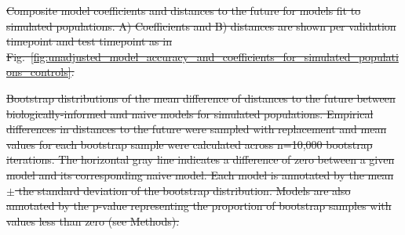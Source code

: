 \documentclass[9pt,lineno]{elife} %
\providecommand{\DIFdel}[1]{{\protect\color{red}\sout{#1}}}                      %
\providecommand{\DIFdelFL}[1]{\DIFdel{#1}} %
\providecommand{\DIFdeltex}[1]{{\protect\color{red}\sout{#1}}}                      %
\providecommand{\DIFdelFL}[1]{\DIFdel{#1}} %
\providecommand{\DIFdel}[1]{\texorpdfstring{\DIFdeltex{#1}}{}} %
\begin{document}
{%
\DIFdelFL{Composite model coefficients and distances to the future for models fit to simulated populations.
  A) Coefficients and B) distances are shown per validation timepoint and test timepoint as in Fig.~\ref{fig:unadjusted_model_accuracy_and_coefficients_for_simulated_populations_controls}.
  }}

{%
\DIFdelFL{Bootstrap distributions of the mean difference of distances to the future between biologically-informed and naive models for simulated populations.
  Empirical differences in distances to the future were sampled with replacement and mean values for each bootstrap sample were calculated across n=10,000 bootstrap iterations.
  The horizontal gray line indicates a difference of zero between a given model and its corresponding naive model.
  Each model is annotated by the mean $\pm$ the standard deviation of the bootstrap distribution.
  Models are also annotated by the p-value representing the proportion of bootstrap samples with values less than zero (see Methods).
  }}
\end{document}
